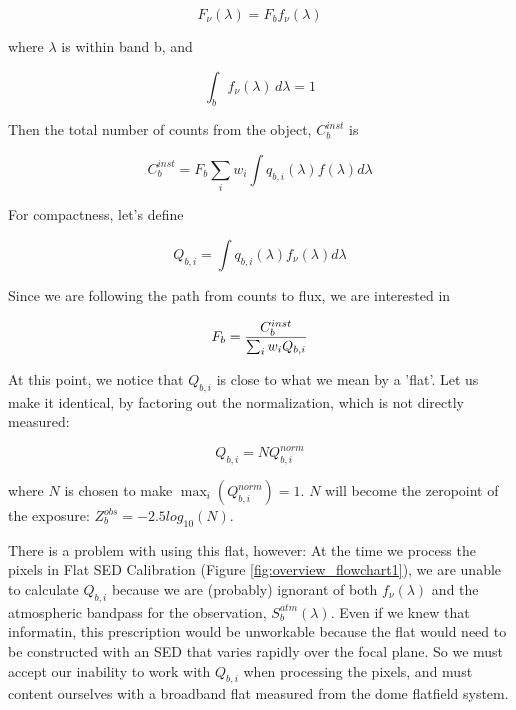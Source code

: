 \documentclass[12pt,preprint]{aastex}
\begin{document}
\begin{equation}
F_\nu(\lambda) = F_b f_\nu(\lambda)
\end{equation}

where $\lambda$ is within band b, and

\begin{equation}
\int_b {f_\nu(\lambda) \, d\lambda} = 1
\end{equation}

Then the total number of counts from the object, $C_b^{inst}$ is

\begin{equation}
C_b^{inst} = F_b \sum_i {w_i \int {q_{b,i}(\lambda) f(\lambda)  d\lambda}}
\end{equation}

For compactness, let's define

\begin{equation}
Q_{b,i} = \int {q_{b,i}(\lambda) f_\nu(\lambda) d\lambda}
\end{equation}

Since we are following the path from counts to flux, we are interested in

\begin{equation}
F_b = {C_b^{inst} \over {\sum_i{w_i Q_{b,i}}}}
\label{eqn:trueFlat}
\end{equation}

At this point, we notice that $Q_{b,i}$ is close to what we mean by a 'flat'.  Let us make it identical, by factoring out 
the normalization, which is not directly measured:

\begin{equation}
Q_{b,i} = N Q_{b,i}^{norm}
\end{equation}

where $N$ is chosen to make $\max_i(Q_{b,i}^{norm}) = 1$.  $N$ will become the zeropoint of the exposure:
$Z_b^{obs} = -2.5 log_{10}(N)$.

There is a problem with using this flat, however:  At the time we process the pixels
in Flat SED Calibration (Figure \ref{fig:overview_flowchart1}), we are unable to calculate $Q_{b,i}$ because we are (probably) ignorant
of both $f_\nu(\lambda)$ and the atmospheric bandpass for the observation, $S_b^{atm}(\lambda)$.  Even if we knew that informatin, 
this prescription would be unworkable because the flat would need to be constructed with an SED 
that varies rapidly over the focal plane.   So we must accept our inability to work with $Q_{b,i}$ when processing the pixels, and must
content ourselves with a broadband flat measured from the dome flatfield system.
\end{document}
